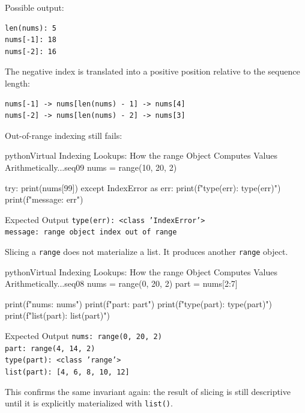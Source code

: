 \documentclass[a4paper,twoside]{report}
\begin{document}
Possible output:

\begin{verbatim}
len(nums): 5
nums[-1]: 18
nums[-2]: 16
\end{verbatim}

The negative index is translated into a positive position relative to the sequence length:

\begin{verbatim}
nums[-1] -> nums[len(nums) - 1] -> nums[4]
nums[-2] -> nums[len(nums) - 2] -> nums[3]
\end{verbatim}

Out-of-range indexing still fails:

\begin{codebox}[]{python}{Virtual Indexing Lookups: How the range Object Computes Values Arithmetically...}{seq09}
nums = range(10, 20, 2)

try:
    print(nums[99])
except IndexError as err:
    print(f"type(err): {type(err)}")
    print(f"message: {err}")
\end{codebox}


\begin{iobox}{Expected Output}
\texttt{type(err): <class 'IndexError'>} \\
\texttt{message: range object index out of range} \\
\end{iobox}


Slicing a \texttt{range} does not materialize a list. It produces another \texttt{range} object.

\begin{codebox}[]{python}{Virtual Indexing Lookups: How the range Object Computes Values Arithmetically...}{seq08}
nums = range(0, 20, 2)
part = nums[2:7]

print(f"nums: {nums}")
print(f"part: {part}")
print(f"type(part): {type(part)}")
print(f"list(part): {list(part)}")
\end{codebox}


\begin{iobox}{Expected Output}
\texttt{nums: range(0, 20, 2)} \\
\texttt{part: range(4, 14, 2)} \\
\texttt{type(part): <class 'range'>} \\
\texttt{list(part): [4, 6, 8, 10, 12]} \\
\end{iobox}


This confirms the same invariant again: the result of slicing is still descriptive until it is explicitly materialized with \texttt{list()}.
\end{document}
